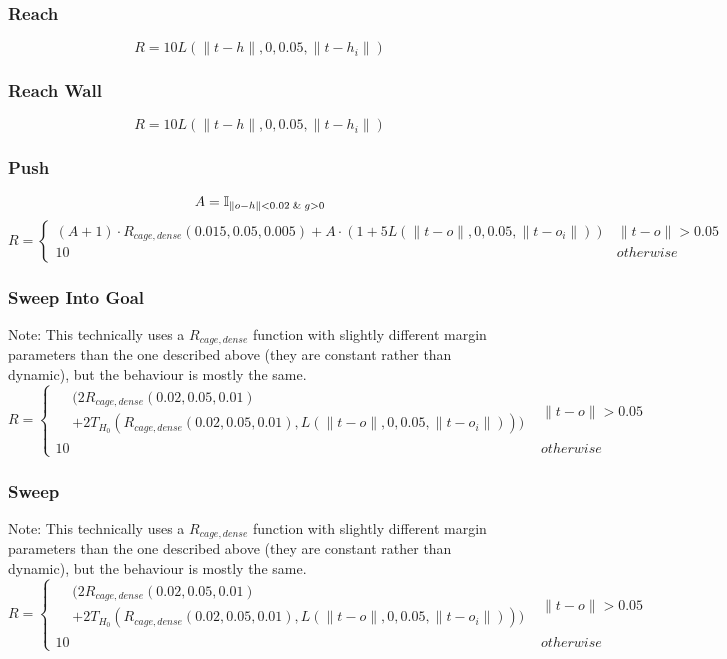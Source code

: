 {\subsubsection{Reach}
\[
R=10L(\lVert t - h \rVert, 0, 0.05, \lVert t - h_i \rVert)
\]

\subsubsection{Reach Wall}
\[
R=10L(\lVert t - h \rVert, 0, 0.05, \lVert t - h_i \rVert)
\]

\subsubsection{Push}
\[
A=\mathbb{I}_{\lVert o - h \rVert < 0.02 \And g > 0}
\]
\[
R=\left\{
    \begin{array}{ll}
    (A+1) \cdot R_{cage,dense}(0.015,0.05,0.005) +
    A \cdot (1 + 5L(\lVert t - o \rVert, 0, 0.05, \lVert t - o_i \rVert))
        & \lVert t - o \rVert > 0.05 \\
    10
        & otherwise
    \end{array}
\right.
\]

\subsubsection{Sweep Into Goal}
Note: This technically uses a $R_{cage,dense}$ function with slightly different margin parameters than the one described above (they are constant rather than dynamic), but the behaviour is mostly the same.
\[
R=\left\{
    \begin{array}{ll}
    \begin{aligned}
        & (2R_{cage,dense}(0.02,0.05,0.01) \\
        & + 2T_{H_0}\left(
            R_{cage,dense}(0.02,0.05,0.01),
            L(\lVert t - o \rVert, 0, 0.05, \lVert t - o_i \rVert)
        \right))
    \end{aligned}
            & \lVert t - o \rVert > 0.05 \\
        10
            & otherwise
    \end{array}
\right.
\]

\subsubsection{Sweep}
Note: This technically uses a $R_{cage,dense}$ function with slightly different margin parameters than the one described above (they are constant rather than dynamic), but the behaviour is mostly the same.
\[
R=\left\{
    \begin{array}{ll}
        \begin{aligned}
        & (2R_{cage,dense}(0.02,0.05,0.01) \\
        & + 2T_{H_0}\left(
            R_{cage,dense}(0.02,0.05,0.01),
            L(\lVert t - o \rVert, 0, 0.05, \lVert t - o_i \rVert)
        \right))
        \end{aligned}
            & \lVert t - o \rVert > 0.05 \\
        10
            & otherwise
    \end{array}
\right.
\]

}
